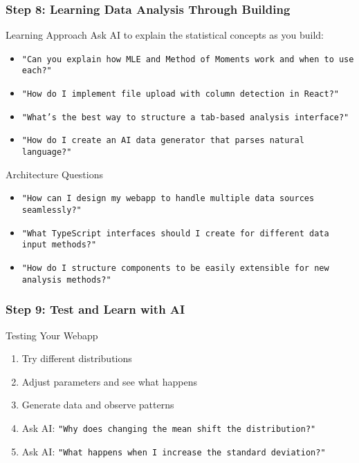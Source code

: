 \documentclass[aspectratio=169]{beamer}
\begin{document}
\begin{frame}
\frametitle{Step 8: Learning Data Analysis Through Building}
\begin{alertblock}{Learning Approach}
Ask AI to explain the statistical concepts as you build:
\begin{itemize}
\footnotesize
\item \texttt{"Can you explain how MLE and Method of Moments work and when to use each?"}
\item \texttt{"How do I implement file upload with column detection in React?"}
\item \texttt{"What's the best way to structure a tab-based analysis interface?"}
\item \texttt{"How do I create an AI data generator that parses natural language?"}
\end{itemize}
\end{alertblock}

\begin{exampleblock}{Architecture Questions}
\begin{itemize}
\footnotesize
\item \texttt{"How can I design my webapp to handle multiple data sources seamlessly?"}
\item \texttt{"What TypeScript interfaces should I create for different data input methods?"}
\item \texttt{"How do I structure components to be easily extensible for new analysis methods?"}
\end{itemize}
\end{exampleblock}
\end{frame}

\begin{frame}
\frametitle{Step 9: Test and Learn with AI}
\begin{alertblock}{Testing Your Webapp}
\begin{enumerate}
\item Try different distributions
\item Adjust parameters and see what happens
\item Generate data and observe patterns
\item Ask AI: \texttt{"Why does changing the mean shift the distribution?"}
\item Ask AI: \texttt{"What happens when I increase the standard deviation?"}
\end{enumerate}
\end{alertblock}
\end{frame}
\end{document}
